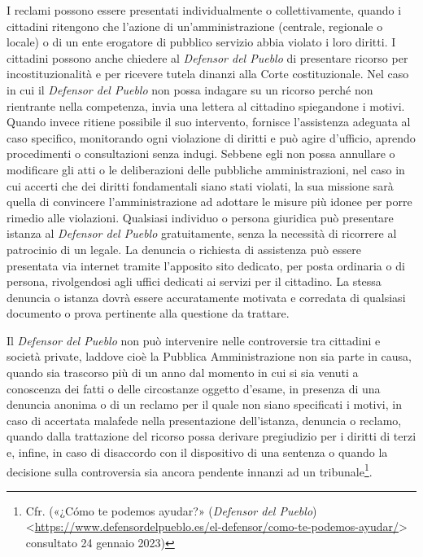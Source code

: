 \documentclass[12pt,it,a4paper,]{report}
\begin{document}
I reclami possono essere presentati individualmente o collettivamente,
quando i cittadini ritengono che l'azione di un'amministrazione
(centrale, regionale o locale) o di un ente erogatore di pubblico
servizio abbia violato i loro diritti. I cittadini possono anche
chiedere al \emph{Defensor del Pueblo} di presentare ricorso per
incostituzionalità e per ricevere tutela dinanzi alla Corte
costituzionale. Nel caso in cui il \emph{Defensor del Pueblo} non possa
indagare su un ricorso perché non rientrante nella competenza, invia una
lettera al cittadino spiegandone i motivi. Quando invece ritiene
possibile il suo intervento, fornisce l'assistenza adeguata al caso
specifico, monitorando ogni violazione di diritti e può agire d'ufficio,
aprendo procedimenti o consultazioni senza indugi. Sebbene egli non
possa annullare o modificare gli atti o le deliberazioni delle pubbliche
amministrazioni, nel caso in cui accerti che dei diritti fondamentali
siano stati violati, la sua missione sarà quella di convincere
l'amministrazione ad adottare le misure più idonee per porre rimedio
alle violazioni. Qualsiasi individuo o persona giuridica può presentare
istanza al \emph{Defensor del Pueblo} gratuitamente, senza la necessità
di ricorrere al patrocinio di un legale. La denuncia o richiesta di
assistenza può essere presentata via internet tramite l'apposito sito
dedicato, per posta ordinaria o di persona, rivolgendosi agli uffici
dedicati ai servizi per il cittadino. La stessa denuncia o istanza dovrà
essere accuratamente motivata e corredata di qualsiasi documento o prova
pertinente alla questione da trattare.

Il \emph{Defensor del Pueblo} non può intervenire nelle controversie tra
cittadini e società private, laddove cioè la Pubblica Amministrazione
non sia parte in causa, quando sia trascorso più di un anno dal momento
in cui si sia venuti a conoscenza dei fatti o delle circostanze oggetto
d'esame, in presenza di una denuncia anonima o di un reclamo per il
quale non siano specificati i motivi, in caso di accertata malafede
nella presentazione dell'istanza, denuncia o reclamo, quando dalla
trattazione del ricorso possa derivare pregiudizio per i diritti di
terzi e, infine, in caso di disaccordo con il dispositivo di una
sentenza o quando la decisione sulla controversia sia ancora pendente
innanzi ad un tribunale\footnote{Cfr. ({«¿Cómo te podemos ayudar?»}
  (\emph{Defensor del Pueblo})
  \textless{}\url{https://www.defensordelpueblo.es/el-defensor/como-te-podemos-ayudar/}\textgreater{}
  consultato 24 gennaio 2023)}.
\end{document}
